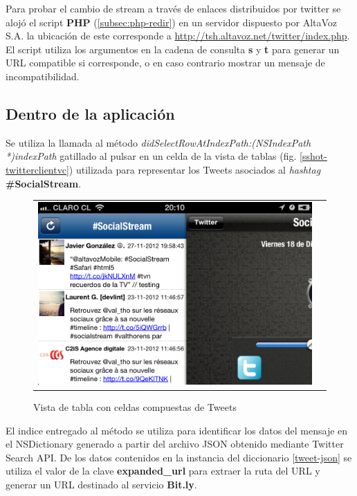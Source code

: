 Para probar el cambio de stream a través de enlaces distribuidos por twitter se alojó el script \textbf{PHP} (\ref{subsec:php-redir}) en un servidor dispuesto por AltaVoz S.A. la ubicación de este corresponde a \url{http://tsh.altavoz.net/twitter/index.php}.
El script utiliza los argumentos en la cadena de consulta \textbf{s} y \textbf{t} para generar un URL compatible si corresponde, o en caso contrario mostrar un mensaje de incompatibilidad.
  \subsection{Dentro de la aplicación}
  \label{subsec:ts-inside}
Se utiliza la llamada al método \textit{didSelectRowAtIndexPath:(NSIndexPath *)indexPath} gatillado al pulsar en un celda de la vista de tablas (fig. \ref{sshot-twitterclientvc}) utilizada para representar los Tweets asociados al \textit{hashtag} \textbf{\#SocialStream}. \\

\begin{figure}[H]
	\centering
	\begin{tabular}{cc}
	\includegraphics[scale=0.3]{imgs/twclient-list.png}
	\end{tabular}
	\caption{Vista de tabla con celdas compuestas de Tweets}
	\label{fig:twclient-list}
\end{figure}

El indice entregado al método se utiliza para identificar los datos del mensaje en el NSDictionary generado a partir del archivo JSON obtenido mediante Twitter Search API. De los datos contenidos en la instancia del diccionario \ref{tweet-json} se utiliza el valor de la clave \textbf{expanded\_url} para extraer la ruta del URL y generar un URL destinado al servicio \textbf{Bit.ly}.  \\

